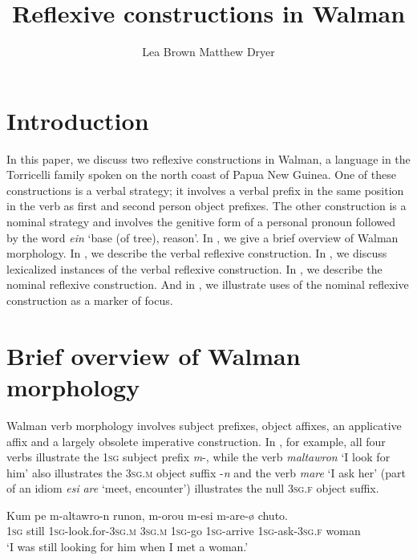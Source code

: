 \documentclass[output=paper]{langscibook}
\author{Lea Brown\affiliation{University at Buffalo} \lastand Matthew Dryer\affiliation{University at Buffalo}}
\title{Reflexive constructions in Walman}
\begin{document}
\maketitle
 
\section{Introduction}\label{sec:Brown:1}

In this paper, we discuss two reflexive constructions in Walman, a language in the Torricelli family spoken on the north coast of Papua New Guinea. One of these constructions is a verbal strategy; it involves a verbal prefix in the same position in the verb as first and second person object prefixes. The other construction is a nominal strategy and involves the genitive form of a personal pronoun followed by the word \emph{ein} ‘base (of tree), reason’. In , we give a brief overview of Walman morphology. In , we describe the verbal reflexive construction. In , we discuss lexicalized instances of the verbal reflexive construction. In , we describe the nominal reflexive construction. And in , we illustrate uses of the nominal reflexive construction as a marker of focus.


\section{Brief overview of Walman morphology}\label{sec:Brown:2}%

  Walman verb morphology involves subject prefixes, object affixes, an applicative affix and a largely obsolete imperative construction.  In , for example, all four verbs illustrate the \textsc{1sg} subject prefix \emph{m}{}-, while the verb \emph{maltawron} ‘I look for him’ also illustrates the \textsc{3sg.m} object suffix -\emph{n} and the verb \emph{mare} ‘I ask her’ (part of an idiom \emph{esi} \emph{are} ‘meet, encounter’) illustrates the null \textsc{3sg.f} object suffix.

\ea%
    \label{ex:Brown:1}
    \gll Kum  pe  m-altawro-n  runon,  m-orou  m-esi  m-are-ø  chuto.\\
    \textsc{1sg}  still  \textsc{1sg}{}-look.for-\textsc{3sg.m}  \textsc{3sg.m}  \textsc{1sg}{}-go  \textsc{1sg}{}-arrive  \textsc{1sg}{}-ask-\textsc{3sg.f}  woman\\
    \glt ‘I was still looking for him when I met a woman.’
    \z 
\end{document}
